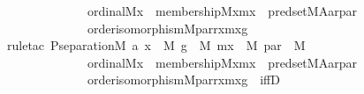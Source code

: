\begin{isabellebody}
\ \ \ \ \ \ \ \ \ \ \ \ \ ordinal{\isacharparenleft}{\kern0pt}{\isacharhash}{\kern0pt}{\isacharhash}{\kern0pt}M{\isacharcomma}{\kern0pt}x{\isacharparenright}{\kern0pt}\ {\isasymand}\ membership{\isacharparenleft}{\kern0pt}{\isacharhash}{\kern0pt}{\isacharhash}{\kern0pt}M{\isacharcomma}{\kern0pt}x{\isacharcomma}{\kern0pt}mx{\isacharparenright}{\kern0pt}\ {\isasymand}\ pred{\isacharunderscore}{\kern0pt}set{\isacharparenleft}{\kern0pt}{\isacharhash}{\kern0pt}{\isacharhash}{\kern0pt}M{\isacharcomma}{\kern0pt}A{\isacharcomma}{\kern0pt}a{\isacharcomma}{\kern0pt}r{\isacharcomma}{\kern0pt}par{\isacharparenright}{\kern0pt}\ {\isasymand}\isanewline
\ \ \ \ \ \ \ \ \ \ \ \ \ order{\isacharunderscore}{\kern0pt}isomorphism{\isacharparenleft}{\kern0pt}{\isacharhash}{\kern0pt}{\isacharhash}{\kern0pt}M{\isacharcomma}{\kern0pt}par{\isacharcomma}{\kern0pt}r{\isacharcomma}{\kern0pt}x{\isacharcomma}{\kern0pt}mx{\isacharcomma}{\kern0pt}g{\isacharparenright}{\kern0pt}{\isacharparenright}{\kern0pt}{\isachardoublequoteclose}\isanewline
%
\isadelimproof
\isanewline
\ \ %
\endisadelimproof
%
\isatagproof
{}\isamarkupfalse%
{\isacharparenleft}{\kern0pt}rule{\isacharunderscore}{\kern0pt}tac\ P{\isacharequal}{\kern0pt}{\isachardoublequoteopen}separation{\isacharparenleft}{\kern0pt}{\isacharhash}{\kern0pt}{\isacharhash}{\kern0pt}M{\isacharcomma}{\kern0pt}\ {\isasymlambda}a{\isachardot}{\kern0pt}\ {\isacharparenleft}{\kern0pt}{\isasymexists}x\ {\isasymin}\ M{\isachardot}{\kern0pt}\ {\isasymexists}g\ {\isasymin}\ M{\isachardot}{\kern0pt}\ {\isasymexists}mx\ {\isasymin}\ M{\isachardot}{\kern0pt}\ {\isasymexists}par\ {\isasymin}\ M{\isachardot}{\kern0pt}\isanewline
\ \ \ \ \ \ \ \ \ \ \ \ \ ordinal{\isacharparenleft}{\kern0pt}{\isacharhash}{\kern0pt}{\isacharhash}{\kern0pt}M{\isacharcomma}{\kern0pt}x{\isacharparenright}{\kern0pt}\ {\isasymand}\ membership{\isacharparenleft}{\kern0pt}{\isacharhash}{\kern0pt}{\isacharhash}{\kern0pt}M{\isacharcomma}{\kern0pt}x{\isacharcomma}{\kern0pt}mx{\isacharparenright}{\kern0pt}\ {\isasymand}\ pred{\isacharunderscore}{\kern0pt}set{\isacharparenleft}{\kern0pt}{\isacharhash}{\kern0pt}{\isacharhash}{\kern0pt}M{\isacharcomma}{\kern0pt}A{\isacharcomma}{\kern0pt}a{\isacharcomma}{\kern0pt}r{\isacharcomma}{\kern0pt}par{\isacharparenright}{\kern0pt}\ {\isasymand}\isanewline
\ \ \ \ \ \ \ \ \ \ \ \ \ order{\isacharunderscore}{\kern0pt}isomorphism{\isacharparenleft}{\kern0pt}{\isacharhash}{\kern0pt}{\isacharhash}{\kern0pt}M{\isacharcomma}{\kern0pt}par{\isacharcomma}{\kern0pt}r{\isacharcomma}{\kern0pt}x{\isacharcomma}{\kern0pt}mx{\isacharcomma}{\kern0pt}g{\isacharparenright}{\kern0pt}{\isacharparenright}{\kern0pt}{\isacharparenright}{\kern0pt}{\isachardoublequoteclose}\ \ iffD{}{\isacharparenright}{\kern0pt}\isanewline

\end{isabellebody}
